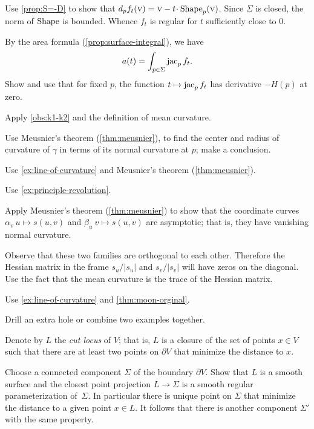 Use \ref{prop:S=-D} to show that $d_pf_t(\vec v)=\vec v-t\cdot\Shape_p(\vec v)$.
Since $\Sigma$ is closed, the norm of $\mathop{\rm Shape}\nolimits$ is bounded.
Whence $f_t$ is regular for $t$ sufficiently close to $ 0$.

 By the area formula (\ref{prop:surface-integral}), we have
\[a(t)=\int_{p\in \Sigma}\mathop{\rm jac}\nolimits_pf_t.\]
Show and use that for fixed $p$, the function $t\mapsto \mathop{\rm jac}\nolimits_pf_t$ has derivative $-H(p)$ at zero.

Apply \ref{obs:k1-k2} and the definition of mean curvature.

 Use Meusnier's theorem (\ref{thm:meusnier}), to find the center and radius of curvature of $\gamma$ in terms of its normal curvature at $p$;
make a conclusion.

Use \ref{ex:line-of-curvature} and Meusnier's theorem (\ref{thm:meusnier}).

 Use \ref{ex:principle-revolution}.

 Apply Meusnier's theorem (\ref{thm:meusnier}) to show that the coordinate curves $\alpha_v\:u\mapsto s(u,v)$ and $\beta_u\:v\mapsto s(u,v)$ are asymptotic; that is, they have vanishing normal curvature.

Observe that these two families are orthogonal to each other.
Therefore the Hessian matrix in the frame $s_u/|s_u|$ and $s_v/|s_v|$ will have zeros on the diagonal.
Use the fact that the mean curvature is the trace of the Hessian matrix.

 Use \ref{ex:line-of-curvature} and \ref{thm:moon-orginal}.

 Drill an extra hole or combine two examples together.

Denote by $L$ the \emph{cut locus} of $V$;
that is, $L$ is a closure of the set of points $x\in V$ such that there are at least two points on $\partial V$ that minimize the distance to $x$.

Choose a connected component $\Sigma$ of the boundary $\partial V$.
Show that $L$ is a smooth surface and the closest point projection $L\to \Sigma$ is a smooth regular parameterization of~$\Sigma$.
In particular there is unique point on $\Sigma$ that minimize the distance to a given point $x\in L$.
It follows that there is another component $\Sigma'$ with the same property.

